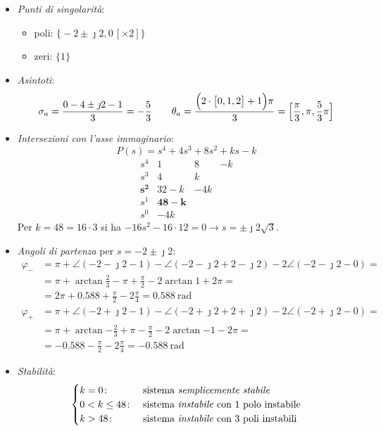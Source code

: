 \begin{itemize}
	\item \emph{Punti di singolarità}:
		\begin{itemize}
			\item poli: \(\bigl\{ -2\pm\jmath2, 0\,[\times 2] \bigr\}\)
			\item zeri: \(\bigl\{ 1 \bigr\}\)
		\end{itemize}
	\item \emph{Asintoti}:
		\[
			\sigma_a = \frac{0-4\pm\jmath2-1}{3} = -\frac{5}{3} \qquad
			\theta_a = \frac{\Bigl(2\cdot \bigl[ 0,1,2 \bigr] +1 \Bigr)\pi}{3} = \Bigl[ \frac{\pi}{3},\pi,\frac{5}{3}\pi \Bigr]
		\]
	\item \emph{Intersezioni con l'asse immaginario}:
		\[
			P(s) = s^4 +4s^3 +8s^2 +ks -k
		\]
		\[\begin{array}{r|rrr}
			s^4 	 & 1    &   8 & -k \\
			s^3 	 & 4    &   k 	   \\
			\bm{s^2} & 32-k & -4k 	   \\
			s^1 	 & \bm{48-k} 	   \\
			s^0 	 & -4k
		\end{array}\]
		Per \(k = 48 = 16\cdot3\) si ha \(-16s^2-16\cdot12=0 \rightarrow
		s = \pm\jmath2\sqrt{3}\).
	\item \emph{Angoli di partenza} per \(s = -2\pm\jmath2\):
		\begin{align*}
			\varphi_- &= \pi + \angle(-2-\jmath2-1) -\angle(-2-\jmath2+2-\jmath2) -2\angle(-2-\jmath2-0) = \\
				  &= \pi + \arctan{\frac{2}{3}} -\pi +\frac{\pi}{2} -2\arctan{1} +2\pi = \\
				  &= 2\pi +0.588 +\frac{\pi}{2} -2\frac{\pi}{4} = \SI{0.588}{\radian} \\
			\varphi_+ &= \pi +\angle(-2+\jmath2-1) -\angle(-2+\jmath2+2+\jmath2) -2\angle(-2+\jmath2-0) = \\
				  &= \pi +\arctan{-\frac{2}{3}} +\pi -\frac{\pi}{2} -2\arctan{-1} -2\pi = \\
				  &= -0.588 -\frac{\pi}{2} -2\frac{\pi}{4} = \SI{-0.588}{\radian}
		\end{align*}
	\item \emph{Stabilità}:
		\[\begin{cases}
			k = 0\colon & \text{sistema \emph{semplicemente stabile}} \\
			0 < k \leq 48\colon & \text{sistema \emph{instabile} con 1 polo instabile} \\
			k > 48\colon & \text{sistema \emph{instabile} con 3 poli instabili}
		\end{cases}\]
\end{itemize}

